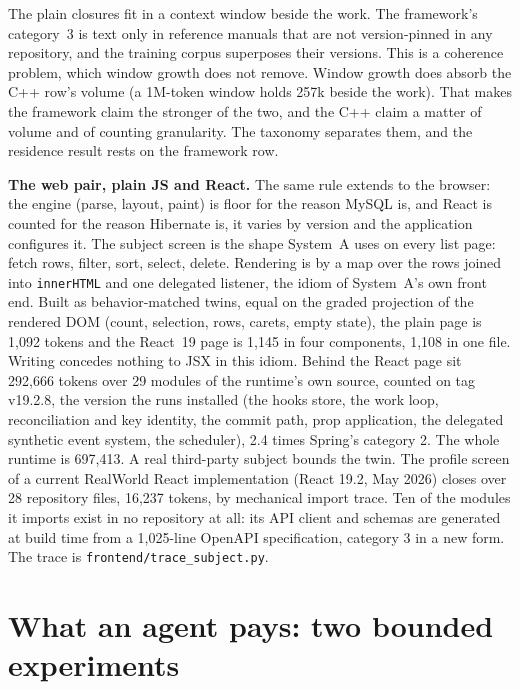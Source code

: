 \documentclass[journal]{IEEEtran}
\begin{document}
The plain closures fit in a context window beside the work. The framework's
category~3 is text only in reference manuals that are not version-pinned in
any repository, and the training corpus superposes their versions. This is a coherence
problem, which window growth does not remove. Window growth does absorb the C++
row's volume (a 1M-token window holds 257k beside the work). That makes the
framework claim the stronger of the two, and the C++ claim a matter of
volume and of counting granularity. The taxonomy separates them, and the
residence result rests on the framework row.

\textbf{The web pair, plain JS and React.} The same rule extends to the
browser: the engine (parse, layout, paint) is floor for the reason MySQL
is, and React is counted for the reason Hibernate is, it varies by
version and the application configures it. The subject screen is the
shape System~A uses on every list page: fetch rows, filter, sort,
select, delete. Rendering is by a map over the rows joined into
\texttt{innerHTML} and one delegated listener, the idiom of System~A's
own front end. Built as behavior-matched twins, equal on the graded projection of
the rendered DOM (count, selection, rows, carets, empty state), the
plain page is 1,092 tokens and the React~19
page is 1,145 in four components, 1,108 in one file. Writing concedes
nothing to JSX in this idiom. Behind the React page sit 292,666 tokens
over 29 modules of the runtime's own source, counted on tag v19.2.8,
the version the runs installed (the
hooks store, the work loop, reconciliation and key identity, the commit
path, prop application, the delegated synthetic event system, the
scheduler), 2.4 times Spring's category 2. The whole runtime is 697,413.
A real third-party subject bounds the twin. The profile screen of a
current RealWorld React implementation (React 19.2, May 2026) closes
over 28 repository files, 16,237 tokens, by mechanical import trace.
Ten of the modules it imports exist in no repository at all: its
API client and schemas are generated at build time from a 1,025-line
OpenAPI specification, category 3 in a new form. The trace is
\texttt{frontend/trace\_subject.py}.

\section{What an agent pays: two bounded experiments}
\label{sec:bounded}
\end{document}
